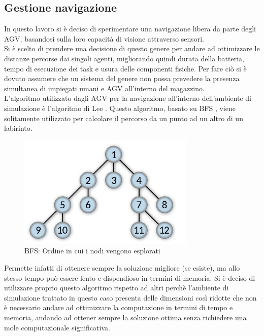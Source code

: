 \documentclass[12pt]{article}
\begin{document}
\subsection{Gestione navigazione}
In questo lavoro si è deciso di sperimentare una navigazione libera da parte degli AGV, basandosi sulla loro capacità di visione attraverso sensori.\\
Si è scelto di prendere una decisione di questo genere per andare ad ottimizzare le distanze percorse dai singoli agenti, migliorando quindi durata della batteria, tempo di esecuzione dei task e usura delle componenti fisiche. Per fare ciò si è dovuto assumere che un sistema del genere non possa prevedere la presenza simultanea di impiegati umani e AGV all'interno del magazzino.\\

\noindent L'algoritmo utilizzato dagli AGV per la navigazione all'interno dell'ambiente di simulazione è l'algoritmo di Lee \cite{Lee}. Questo algoritmo, basato su BFS \cite{BFS}, viene solitamente utilizzato per calcolare il percorso da un punto ad un altro di un labirinto. 

\begin{figure}[ht]
\centering
\includegraphics[width=0.75\textwidth,keepaspectratio]{Figures/Vario/BFS.png}
\caption[BFS: Ordine in cui i nodi vengono esplorati]{BFS: Ordine in cui i nodi vengono esplorati}
\label{fig:BFS}
\end{figure}

\noindent Permette infatti di ottenere sempre la soluzione migliore (se esiste), ma allo stesso tempo può essere lento e dispendioso in termini di memoria.
Si è deciso di utilizzare proprio questo algoritmo rispetto ad altri perchè l'ambiente di simulazione trattato in questo caso presenta delle dimensioni così ridotte che non è necessario andare ad ottimizzare la computazione in termini di tempo e memoria, andando ad ottener sempre la soluzione ottima senza richiedere una mole computazionale significativa.
\newpage
\end{document}

